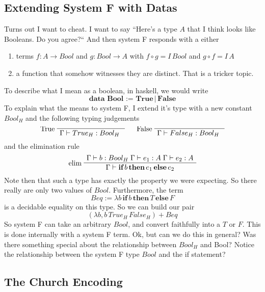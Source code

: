 \documentclass[12pt]{article}
\newenvironment{bprooftree}
  {\leavevmode\hbox\bgroup}
  {\DisplayProof\egroup}
\begin{document}
\subsection{Extending System F with Datas}
Turns out I want to cheat.
I want to say ``Here's a type $A$ that I think looks like Booleans. Do you agree?``
And then system F responds with a either 
\begin{enumerate}
    \item terms $f : A \rightarrow Bool$ and $g : Bool \rightarrow A$ with $f \circ g = I\, Bool$ and $g \circ f = I\, A$
    \item a function that somehow witnesses they are distinct. That is a tricker topic.
\end{enumerate}
To describe what I mean as a boolean, in haskell, we would write 
\[
\textbf{data }\textbf{Bool := True}\,|\,\textbf{False}
\]
To explain what the means to system F, I extend it's type with a new constant $Bool_H$ and the following typing judgements
\[
\begin{bprooftree}
\AxiomC{}
\LeftLabel{True}
\UnaryInfC{$\Gamma \vdash True_H : Bool_H$ }
\end{bprooftree}\quad
\begin{bprooftree}
\AxiomC{}
\LeftLabel{False}
\UnaryInfC{$\Gamma \vdash False_H : Bool_H$ }
\end{bprooftree}
\]
and the elimination rule
\[
\begin{bprooftree}
\AxiomC{$\Gamma \vdash b : Bool_H\; \Gamma \vdash e_1 : A\; \Gamma \vdash e_2 : A$}
\LeftLabel{elim}
\UnaryInfC{$\Gamma \vdash \textbf{if}\, b\, \textbf{then}\, e_1 \,\textbf{else}\,e_2$}
\end{bprooftree}
\]
Note then that such a type has exactly the property we were expecting.
So there really are only two values of $Bool$.
Furthermore, the term 
\[
 Beq := \lambda b\, \textbf{if}\, b\, \textbf{then}\, T \,\textbf{else}\, F
\] 
is a decidable equality on this type.
So we can build our pair 
\[
  (\lambda b, b\, True_H\, False_H) + Beq
\]
So system F can take an arbitrary $Bool$, and convert faithfully into a $T$ or $F$.
This is done internally with a system F term.
Ok, but can we do this in general?
Was there something special about the relationship between $Bool_H$ and Bool?
Notice the relationship between the system F type $Bool$ and the if statement?

\subsection{The Church Encoding}
\end{document}
